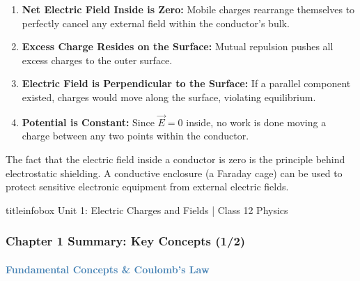 \begin{frame}
\begin{frame}
\begin{keybox}
\vspace{0.1cm}
\begin{enumerate}
    \item \textbf{Net Electric Field Inside is Zero:} Mobile charges rearrange themselves to perfectly cancel any external field within the conductor's bulk.
    \item \textbf{Excess Charge Resides on the Surface:} Mutual repulsion pushes all excess charges to the outer surface.
    \item \textbf{Electric Field is Perpendicular to the Surface:} If a parallel component existed, charges would move along the surface, violating equilibrium.
    \item \textbf{Potential is Constant:} Since $\vec{E}=0$ inside, no work is done moving a charge between any two points within the conductor.
\end{enumerate}
\vspace{0.1cm}
\end{keybox}

\vspace{0.3cm}

\begin{importantbox}
\vspace{0.1cm}
The fact that the electric field inside a conductor is zero is the principle behind electrostatic shielding. A conductive enclosure (a Faraday cage) can be used to protect sensitive electronic equipment from external electric fields.
\vspace{0.1cm}
\end{importantbox}

\vfill

\begin{beamercolorbox}[wd=\textwidth,ht=0.5cm,dp=0.1cm,center]{titleinfobox}
    \small\color{coolgray} Unit 1: Electric Charges and Fields | Class 12 Physics
\end{beamercolorbox}
\end{frame}

\begin{frame}
\frametitle{\textsf{\textbf{Chapter 1 Summary:} Key Concepts (1/2)}}
\framesubtitle{\textcolor{steelblue}{Fundamental Concepts & Coulomb's Law}}


\end{frame}
\end{frame}

